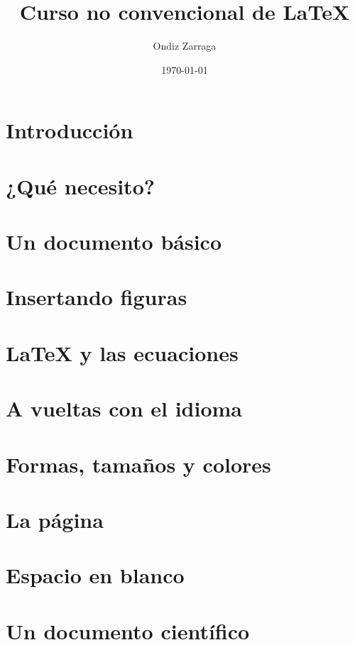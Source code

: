 \documentclass[a4paper,10pt]{book}
\title{Curso no convencional de \LaTeX}
\author{Ondiz Zarraga}
\date{\today}
\begin{document}
\maketitle

\tableofcontents
\listoftables
\listoffigures

\chapter{Introducción}


\chapter{¿Qué necesito?}


\chapter{Un documento básico}


\chapter{Insertando figuras}


\chapter{LaTeX y las ecuaciones}


\chapter{A vueltas con el idioma}\label{ch:idioma}


\chapter{Formas, tamaños y colores}


\chapter{La página}


\chapter{Espacio en blanco}\label{ch:blanco}


\chapter{Un documento científico}



% 
%
\end{document}
